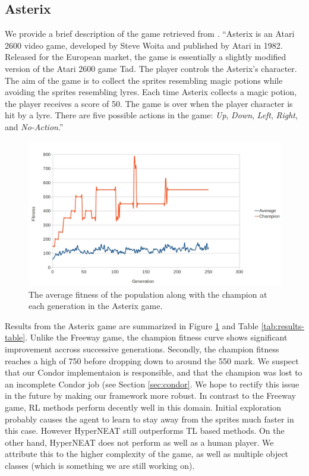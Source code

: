\documentclass{article}
\begin{document}
\subsection {Asterix}
We provide a brief description of the game retrieved from \cite{naddaf10}. ``Asterix is an Atari 2600 video game, developed by Steve Woita and published by Atari in 1982. Released for the European market, the game is essentially a slightly modified version of the Atari 2600 game Tad. The player controls the Asterix’s character. The aim of the game is to collect the sprites resembling magic potions while avoiding the sprites resembling lyres. Each time Asterix collects a magic potion, the player receives a score of 50. The game is over when the player character is hit by a lyre. There are five possible actions in the game: \textit{Up}, \textit{Down}, \textit{Left}, \textit{Right}, and \textit{No-Action}.''

\begin{figure}[ht]
\begin{center}
\includegraphics[scale=.35]{figures/asterix.jpg}
\end{center}
\caption{The average fitness of the population along with the champion at each generation in the Asterix game.}
\label{fig:asterix-curve}
\end{figure}

Results from the Asterix game are summarized in Figure \ref{fig:asterix-curve} and Table \ref{tab:results-table}. Unlike the Freeway game, the champion fitness curve shows significant improvement accross successive generations. Secondly, the champion fitness reaches a high of 750 before dropping down to around the 550 mark. We suspect that our Condor implementaion is responsible, and that the champion was lost to an incomplete Condor job (see Section \ref{sec:condor}. We hope to rectify this issue in the future by making our framework more robust. In contrast to the Freeway game, RL methods perform decently well in this domain. Initial exploration probably causes the agent to learn to stay away from the sprites much faster in this case. However HyperNEAT still outperforms TL based methods. On the other hand, HyperNEAT does not perform as well as a human player. We attribute this to the higher complexity of the game, as well as multiple object classes (which is something we are still working on). 
\end{document}
